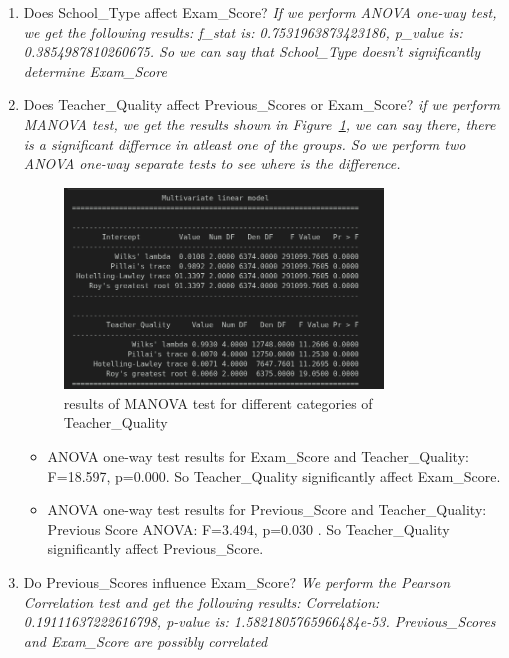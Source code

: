 \documentclass{article}
\begin{document}
\begin{enumerate}
\begin{enumerate}[label= \alph*]
        \item Does School\_Type affect Exam\_Score? 
        \textit{If we perform ANOVA one-way test, we get the following results: f\_stat is: 0.7531963873423186, p\_value is: 0.3854987810260675. So we can say that School\_Type doesn't significantly determine Exam\_Score }
       
        \item Does Teacher\_Quality affect Previous\_Scores or Exam\_Score?
        \textit{if we perform MANOVA test, we get the results shown in Figure~\ref{fig:Figure_10}, we can say there, there is a significant differnce in atleast one of the groups. So we perform two ANOVA one-way separate tests to see where is the difference.}
        \begin{figure}[H]  %

            \centering
            \includegraphics[width=0.8\textwidth]{./images/student_MANOVA_for_teacher_quality.png}  %
            \caption{results of MANOVA test for different categories of Teacher\_Quality}
            \label{fig:Figure_10}  %

        \end{figure}
        \begin{itemize}
            \item ANOVA one-way test results for Exam\_Score and Teacher\_Quality: F=18.597, p=0.000. So Teacher\_Quality significantly affect Exam\_Score.
            \item ANOVA one-way test results for Previous\_Score and Teacher\_Quality: Previous Score ANOVA: F=3.494, p=0.030 . So Teacher\_Quality significantly affect Previous\_Score.
        \end{itemize}

        \item Do Previous\_Scores influence Exam\_Score? 
        \textit{We perform the Pearson Correlation test and get the following results: Correlation: 0.19111637222616798, p-value is: 1.5821805765966484e-53. Previous\_Scores and Exam\_Score are possibly correlated}


\end{enumerate}
\end{enumerate}
\end{document}
